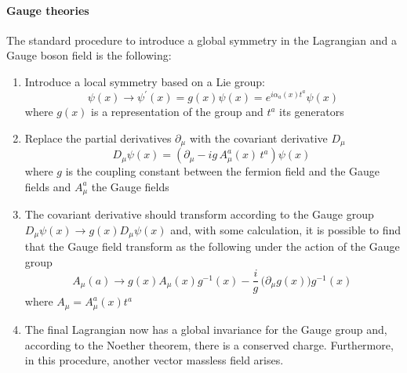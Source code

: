 \paragraph*{Gauge theories}
The standard procedure to introduce a global symmetry in the Lagrangian and a Gauge boson field is the following:
\begin{enumerate}
    \item Introduce a local symmetry based on a Lie group:
    \begin{equation}\label{eq:spinor_gauge}
        \psi(x) \to \psi^\prime (x)=g(x) \psi(x) = e^{i \alpha_a(x) t^a}\psi(x)
    \end{equation}
    where $g(x)$ is a representation of the group and $t^a$ its generators
    \item Replace the partial derivatives $\partial_\mu$ with the covariant derivative $D_\mu$
    \begin{equation}\label{eq:covariant_derivative}
        D_{\mu}\psi(x)=\left(\partial_{\mu}-i g\,A_{\mu}^{a}(x)\,t^{a}\right)\psi(x)\;
    \end{equation}
    where $g$ is the coupling constant between the fermion field and the Gauge fields and $A^a_\mu$ the Gauge fields 
    \item The covariant derivative should transform according to the Gauge group $D_\mu \psi(x)\to g(x) D_\mu \psi(x)$ and, with some calculation, it is possible to find that the Gauge field transform as the following under the action of the Gauge group
    \begin{equation}\label{eq:gauge_field_transformation}
        A_{\mu}(a)\rightarrow g(x)A_{\mu}(x)g^{-1}(x)-\frac i g\,\bigg(\partial_{\mu} g(x)\bigg) g^{-1}(x)\,
    \end{equation}
    where $A_\mu=A_\mu^a(x)t^a$
    \item The final Lagrangian now has a global invariance for the Gauge group and, according to the Noether theorem, there is a conserved charge. Furthermore, in this procedure, another vector massless field arises.
\end{enumerate}
